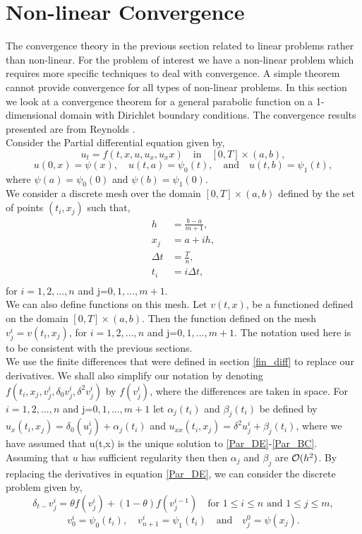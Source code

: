 \section{Non-linear Convergence}
The convergence theory in the previous section related to linear problems rather than non-linear. For the problem of interest we have a non-linear problem which requires more specific techniques to deal with convergence. A simple theorem cannot provide convergence for all types of non-linear problems. In this section we look at a convergence theorem for a general parabolic function on a 1-dimensional domain with Dirichlet boundary conditions. The convergence results presented are from Reynolds \cite{reynolds72}. \\
Consider the Partial differential equation given by,
\begin{equation}
u_t=f(t,x,u,u_x,u_xx)\quad	\text{in}\quad 	[0,T]\times(a,b), \label{Par_DE}
\end{equation}
\begin{equation}
u(0,x)=\psi(x),\quad u(t,a)=\psi_0(t), \quad \textrm{and} \quad u(t,b)=\psi_1(t), \label{Par_BC}
\end{equation}
where $\psi(a)=\psi_0(0)$ and $\psi(b)=\psi_1(0)$.\\
We consider a discrete mesh over the domain $[0,T]\times (a,b)$ defined by  the set of points $(t_i,x_j)$ such that,
\begin{align*}
h&=\frac{b-a}{m+1},\\
x_j&=a+ih,\\
\Delta t&=\frac{T}{n},\\
t_i&= i\Delta t,\\
\end{align*}
for $i=1,2,...,n$ and j=$0,1,...,m+1$.\\
We can also define functions on this mesh. Let $v(t,x)$, be a functioned defined on the domain $[0,T]\times (a,b)$. Then the function defined on the mesh $v_j^i=v(t_i,x_j)$, for $i=1,2,...,n$ and j=$0,1,...,m+1$. The notation used here is to be consistent with the previous sections. \\
We use the finite differences that were defined in section \ref{fin_diff} to replace our derivatives. We shall also simplify our notation by denoting $f(t_i,x_j,v^i_j,\delta_0v^i_j,\delta^2v^i_j)$ by $f(v^i_j)$, where the differences are taken in space. For $i=1,2,...,n$ and j=$0,1,...,m+1$ let $\alpha_j(t_i)$ and $\beta_j(t_i)$ be defined by $u_x(t_i,x_j)=\delta_0(u^i_j)+\alpha_j(t_i)$ and $u_{xx}(t_i,x_j)=\delta^2 u^i_j+\beta_j(t_i)$, where we have assumed that u(t,x) is the unique solution to \ref{Par_DE}-\ref{Par_BC}. Assuming that $u$ has sufficient regularity then then $\alpha_j$ and $\beta_j$ are $\mathcal{O} (h^2)$.    
By replacing the derivatives in equation \ref{Par_DE}, we can consider the discrete problem given by,
\begin{equation}
\delta_{t-}v^i_j=\theta f(v^i_j)+(1-\theta)f(v^{i-1}_j) \quad \text{for	} 1\leq i\leq n \text{ and } 1\leq j\leq m, \label{par_fin}
\end{equation}
\begin{equation}
v_0^i=\psi_0(t_i), \quad v_{n+1}^i=\psi_1(t_i) \quad \textrm{and} \quad v^0_j=\psi(x_j).
\end{equation}

